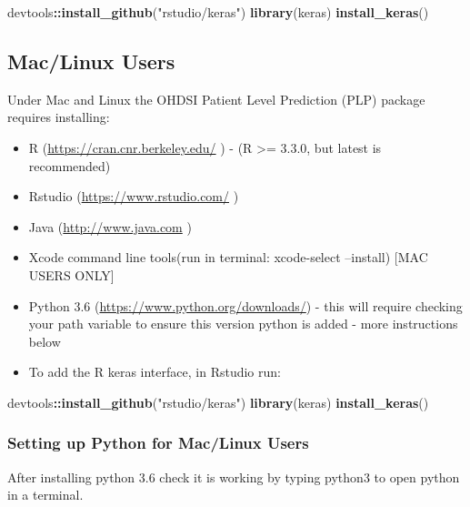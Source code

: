 \documentclass[]{article}
\newenvironment{Shaded}{\begin{snugshade}}{\end{snugshade}}
\newcommand{\KeywordTok}[1]{\textcolor[rgb]{0.13,0.29,0.53}{\textbf{#1}}}
\newcommand{\StringTok}[1]{\textcolor[rgb]{0.31,0.60,0.02}{#1}}
\newcommand{\OperatorTok}[1]{\textcolor[rgb]{0.81,0.36,0.00}{\textbf{#1}}}
\newcommand{\NormalTok}[1]{#1}
\providecommand{\tightlist}{%
  \setlength{\itemsep}{0pt}\setlength{\parskip}{0pt}}
\begin{document}
\begin{Shaded}
\begin{Highlighting}[]
\NormalTok{devtools}\OperatorTok{::}\KeywordTok{install_github}\NormalTok{(}\StringTok{"rstudio/keras"}\NormalTok{)}
\KeywordTok{library}\NormalTok{(keras)}
\KeywordTok{install_keras}\NormalTok{()}
\end{Highlighting}
\end{Shaded}

\subsection{Mac/Linux Users}\label{maclinux-users}

Under Mac and Linux the OHDSI Patient Level Prediction (PLP) package
requires installing:

\begin{itemize}
\tightlist
\item
  R (\url{https://cran.cnr.berkeley.edu/} ) - (R \textgreater{}= 3.3.0,
  but latest is recommended)
\item
  Rstudio (\url{https://www.rstudio.com/} )
\item
  Java (\url{http://www.java.com} )
\item
  Xcode command line tools(run in terminal: xcode-select --install)
  {[}MAC USERS ONLY{]}
\item
  Python 3.6 (\url{https://www.python.org/downloads/}) - this will
  require checking your path variable to ensure this version python is
  added - more instructions below
\item
  To add the R keras interface, in Rstudio run:
\end{itemize}

\begin{Shaded}
\begin{Highlighting}[]
\NormalTok{devtools}\OperatorTok{::}\KeywordTok{install_github}\NormalTok{(}\StringTok{"rstudio/keras"}\NormalTok{)}
\KeywordTok{library}\NormalTok{(keras)}
\KeywordTok{install_keras}\NormalTok{()}
\end{Highlighting}
\end{Shaded}

\subsubsection{Setting up Python for Mac/Linux
Users}\label{setting-up-python-for-maclinux-users}

After installing python 3.6 check it is working by typing python3 to
open python in a terminal.
\end{document}
